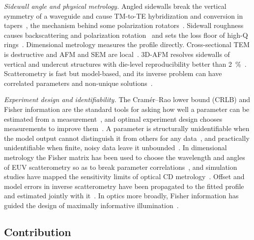 \textit{Sidewall angle and physical metrology.} Angled sidewalls break the vertical symmetry of a waveguide and cause
TM-to-TE hybridization and conversion in tapers~\cite{dai2015,mdpi2021}, the mechanism behind some polarization
rotators~\cite{dai2011}. Sidewall roughness causes backscattering and polarization rotation~\cite{morichetti2010}
and sets the loss floor of high-Q rings~\cite{biberman2012}. Dimensional metrology measures the profile directly.
Cross-sectional TEM is destructive and AFM and SEM are local~\cite{orji2018}. 3D-AFM resolves sidewalls of vertical and
undercut structures with die-level reproducibility better than \qty{2}{\percent}~\cite{yoo2022}. Scatterometry is
fast but model-based, and its inverse problem can have correlated parameters and non-unique
solutions~\cite{raymond2005,orji2018}.

\textit{Experiment design and identifiability.} The Cram\'er--Rao lower bound (CRLB) and Fisher information are the
standard tools for asking how well a parameter can be estimated from a measurement~\cite{kay1993}, and optimal
experiment design chooses measurements to improve them~\cite{pukelsheim2006}. A parameter is structurally
unidentifiable when the model output cannot distinguish it from others for any data~\cite{bellman1970}, and
practically unidentifiable when finite, noisy data leave it unbounded~\cite{raue2009}. In dimensional metrology the
Fisher matrix has been used to choose the wavelength and angles of EUV scatterometry so as to break parameter
correlations~\cite{klein2025}, and simulation studies have mapped the sensitivity limits of optical CD
metrology~\cite{silver2007}. Offset and model errors in inverse scatterometry have been propagated to the fitted
profile~\cite{alassaad2007} and estimated jointly with it~\cite{henn2012}. In optics more broadly, Fisher
information has guided the design of maximally informative illumination~\cite{bouchet2021}.

\subsection{Contribution}

